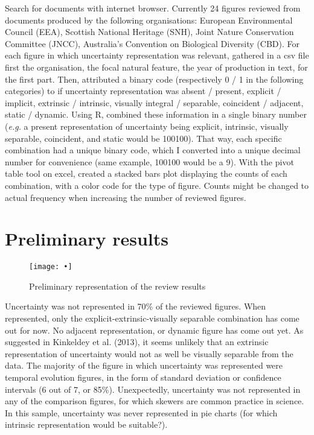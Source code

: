 \documentclass[12pt,a4paper,draft]{article}
\begin{document}
Search for documents with internet browser.
Currently 24 figures reviewed from documents produced by the following organisations: European Environmental Council (EEA), Scottish National Heritage (SNH), Joint Nature Conservation Committee (JNCC), Australia's Convention on Biological Diversity (CBD).
For each figure in which uncertainty representation was relevant, gathered in a csv file first the organisation, the focal natural feature, the year of production in text, for the first part.
Then, attributed a binary code (respectively 0 / 1 in the following categories) to if uncertainty representation was absent / present, explicit / implicit, extrinsic / intrinsic, visually integral / separable, coincident / adjacent, static / dynamic.
Using R, combined these information in a single binary number (\textit{e.g.} a present representation of uncertainty being explicit, intrinsic, visually separable, coincident, and static would be 100100).
That way, each specific combination had a unique binary code, which I converted into a unique decimal number for convenience (same example, 100100 would be a 9).
With the pivot table tool on excel, created a stacked bars plot displaying the counts of each combination, with a color code for the type of figure.
Counts might be changed to actual frequency when increasing the number of reviewed figures.

\section{Preliminary results}

\begin{figure}
\centering
\texttt{[image: •]}
\caption{Preliminary representation of the review results}
\label{prelifig}
\end{figure}

Uncertainty was not represented in 70\% of the reviewed figures.
When represented, only the explicit-extrinsic-visually separable combination has come out for now.
No adjacent representation, or dynamic figure has come out yet.
As suggested in Kinkeldey et al. (2013), it seems unlikely that an extrinsic representation of uncertainty would not as well be visually separable from the data.
The majority of the figure in which uncertainty was represented were temporal evolution figures, in the form of standard deviation or confidence intervals (6 out of 7, or 85\%).
Unexpectedly, uncertainty was not represented in any of the comparison figures, for which skewers are common practice in science.
In this sample, uncertainty was never represented in pie charts (for which intrinsic representation would be suitable?).
\end{document}
